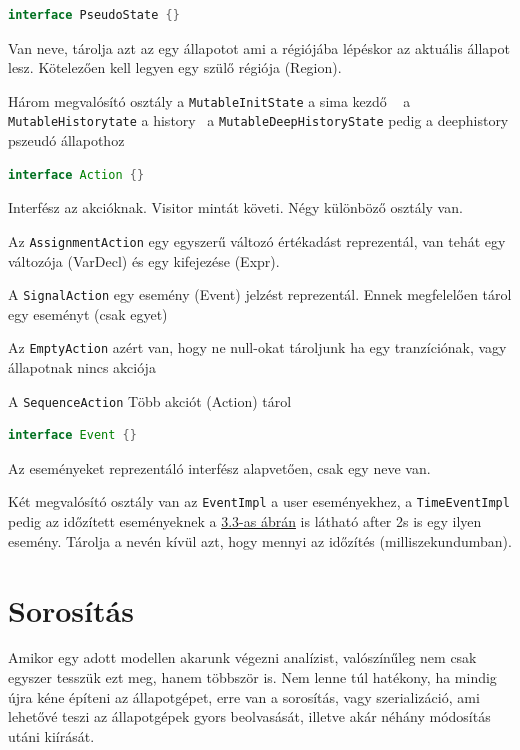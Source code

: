 \begin{lstlisting}[language=java,breaklines=true]
interface PseudoState {}
\end{lstlisting}

Van neve, tárolja azt az egy állapotot ami a régiójába lépéskor az aktuális állapot lesz. Kötelezően kell legyen egy szülő régiója (Region).

Három megvalósító osztály a \verb+MutableInitState+ a sima kezdő ~ a \verb+MutableHistorytate+ a history~ a \verb+MutableDeepHistoryState+ pedig a deephistory pszeudó állapothoz

\begin{lstlisting}[language=java,breaklines=true]
interface Action {}
\end{lstlisting}

Interfész az akcióknak. Visitor mintát követi. Négy különböző osztály van. 

Az \verb+AssignmentAction+ egy egyszerű változó értékadást reprezentál, van tehát egy változója (VarDecl) és egy kifejezése (Expr).

A \verb+SignalAction+ egy esemény (Event) jelzést reprezentál. Ennek megfelelően tárol egy eseményt (csak egyet)

Az \verb+EmptyAction+ azért van, hogy ne null-okat tároljunk ha egy tranzíciónak, vagy állapotnak nincs akciója

A \verb+SequenceAction+ Több akciót (Action) tárol

\begin{lstlisting}[language=java,breaklines=true]
interface Event {}
\end{lstlisting}

Az eseményeket reprezentáló interfész alapvetően, csak egy neve van.

Két megvalósító osztály van az \verb+EventImpl+ a user eseményekhez, a \verb+TimeEventImpl+ pedig az időzített eseményeknek a \hyperref[fig:statechart]{3.3-as ábrán} is látható after 2s is egy ilyen esemény. Tárolja a nevén kívül azt, hogy mennyi az időzítés (milliszekundumban).


\section{Sorosítás}

Amikor egy adott modellen akarunk végezni analízist, valószínűleg nem csak egyszer tesszük ezt meg, hanem többször is. Nem lenne túl hatékony, ha mindig újra kéne építeni az állapotgépet, erre van a sorosítás, vagy szerializáció, ami lehetővé teszi az állapotgépek gyors beolvasását, illetve akár néhány módosítás utáni kiírását.

